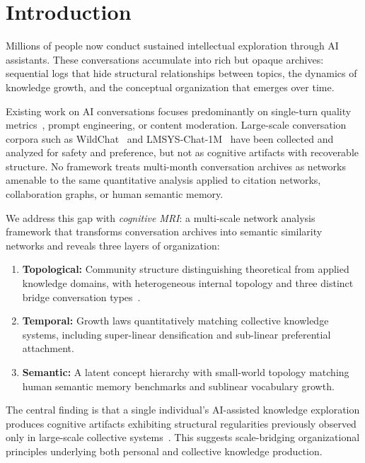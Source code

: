 \documentclass[journal]{IEEEtran}
\begin{document}
\section{Introduction}
\label{sec:intro}

Millions of people now conduct sustained intellectual exploration
through AI assistants.  These conversations accumulate into rich but
opaque archives: sequential logs that hide structural relationships
between topics, the dynamics of knowledge growth, and the conceptual
organization that emerges over time.

Existing work on AI conversations focuses predominantly on single-turn
quality metrics~\cite{zhao2023survey}, prompt engineering, or content
moderation.  Large-scale conversation corpora such as
WildChat~\cite{zhao2024wildchat} and
LMSYS-Chat-1M~\cite{zheng2024lmsys} have been collected and analyzed
for safety and preference, but not as cognitive artifacts with
recoverable structure.  No framework treats multi-month conversation
archives as networks amenable to the same quantitative analysis applied
to citation networks, collaboration graphs, or human semantic memory.

We address this gap with \emph{cognitive MRI}: a multi-scale network
analysis framework that transforms conversation archives into semantic
similarity networks and reveals three layers of organization:

\begin{enumerate}
\item \textbf{Topological:} Community structure distinguishing theoretical
  from applied knowledge domains, with heterogeneous internal topology
  and three distinct bridge conversation
  types~\cite{towell2025cognitive}.
\item \textbf{Temporal:} Growth laws quantitatively matching collective
  knowledge systems, including super-linear densification and sub-linear
  preferential attachment.
\item \textbf{Semantic:} A latent concept hierarchy with small-world
  topology matching human semantic memory benchmarks and sublinear
  vocabulary growth.
\end{enumerate}

The central finding is that a single individual's AI-assisted knowledge
exploration produces cognitive artifacts exhibiting structural
regularities previously observed only in large-scale collective
systems~\cite{leskovec2007graph, steyvers2005large}.  This suggests
scale-bridging organizational principles underlying both personal and
collective knowledge production.
\end{document}
